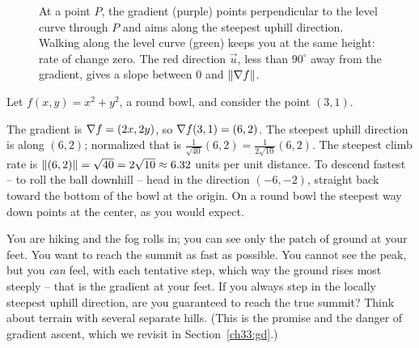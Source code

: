 \begin{figure}[H]
\centering
{}
\caption{At a point $P$, the gradient (purple) points perpendicular to the level
curve through $P$ and aims along the steepest uphill direction. Walking along the
level curve (green) keeps you at the same height: rate of change zero. The red
direction $\vec u$, less than $90^\circ$ away from the gradient, gives a slope
between $0$ and $\lVert\nabla f\rVert$.}
\label{ch33:fig-steepest}
\end{figure}

\begin{example}
\label{ch33:ex-steepest}
Let $f(x,y)=x^2+y^2$, a round bowl, and consider the point $(3,1)$.

The gradient is $\nabla f = (2x,2y)$, so $\nabla f(3,1)=(6,2)$. The steepest uphill
direction is along $(6,2)$; normalized that is
$\tfrac{1}{\sqrt{40}}(6,2) = \tfrac{1}{2\sqrt{10}}(6,2)$. The steepest climb rate
is $\lVert(6,2)\rVert=\sqrt{40}=2\sqrt{10}\approx 6.32$ units per unit distance. To
descend fastest -- to roll the ball downhill -- head in the direction $(-6,-2)$,
straight back toward the bottom of the bowl at the origin. On a round bowl the
steepest way down points at the center, as you would expect.
\end{example}

\begin{walkbox}
You are hiking and the fog rolls in; you can see only the patch of ground at your
feet. You want to reach the summit as fast as possible. You cannot see the peak,
but you \emph{can} feel, with each tentative step, which way the ground rises most
steeply -- that is the gradient at your feet. If you always step in the locally
steepest uphill direction, are you guaranteed to reach the true summit? Think
about terrain with several separate hills. (This is the promise and the danger
of gradient ascent, which we revisit in Section~\ref{ch33:gd}.)
\end{walkbox}

